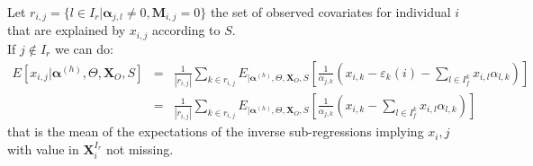 \documentclass[12pt,a4paper]{report}
\begin{document}
	Let $r_{i,j}=\{l \in I_r| \boldsymbol{\alpha}_{j,l}\neq 0, \boldsymbol{M}_{i,j}=0 \}$ the set of observed covariates for individual $i$ that are explained by $x_{i,j}$ according to $S$.
	\\
	If $j\notin I_r$ we can do:
	\begin{eqnarray}
	E[x_{i,j}|\boldsymbol{\alpha}^{(h)},\Theta,\boldsymbol{X}_O,S]&=&\frac{1}{|r_{i,j}|}\sum_{k \in r_{i,j}}E_{|\boldsymbol{\alpha}^{(h)},\Theta,\boldsymbol{X}_O,S}\left[\frac{1}{\alpha_{j,k}}\left(x_{i,k}-\varepsilon_{k}(i)-\sum_{l \in I_f^k} x_{i,l}\alpha_{l,k}\right)\right] \\
	&=& \frac{1}{|r_{i,j}|}\sum_{k \in r_{i,j}}E_{|\boldsymbol{\alpha}^{(h)},\Theta,\boldsymbol{X}_O,S}\left[\frac{1}{\alpha_{j,k}}\left(x_{i,k}- \sum_{l \in I_f^k} x_{i,l}\alpha_{l,k}\right)\right]
	\end{eqnarray}
	that is the mean of the expectations of the inverse sub-regressions implying $x_i,j$ with value in $\boldsymbol{X}^{I_r}_i$ not missing.
\end{document}

